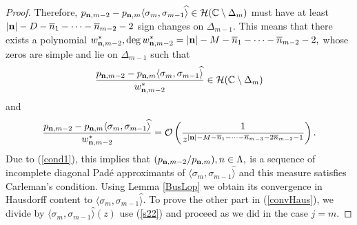 \documentclass[10pt,a4paper]{article}
\theoremstyle{definition}
\theoremstyle{remark}
\numberwithin{equation}{section}
\begin{document}
\begin{proof}
Therefore, $ p_{{\bf n},m-2}- p_{{\bf n},m} \langle \sigma_{m}, \sigma_{m-1} \widehat{\rangle} \in \mathcal{H}(\mathbb{C} \setminus \Delta_m)$ must have at least $|{\bf n}| -D- \overline{n}_1 - \cdots-\overline{n}_{m-2} -2$ sign changes on $\Delta_{m-1}$. This means that there exists a polynomial $w_{{\bf n},m-2}^*, \deg w_{{\bf n},m-2}^* = |{\bf n}| -M- \overline{n}_1 - \cdots-\overline{n}_{m-2} -2,$ whose zeros are simple and lie on $\Delta_{m-1}$ such that
\[ \frac{p_{{\bf n},m-2}- p_{{\bf n},m} \langle \sigma_{m}, \sigma_{m-1} \widehat{\rangle}}{w_{{\bf n},m-2}^*} \in \mathcal{H}(\mathbb{C} \setminus \Delta_m)
\]
and
\[ \frac{p_{{\bf n},m-2}- p_{{\bf n},m} \langle \sigma_{m}, \sigma_{m-1} \widehat{\rangle}}{w_{{\bf n},m-2}^*}  = \mathcal{O}\left(\frac{1}{z^{{|{\bf n}| -M- \overline{n}_1 - \cdots-\overline{n}_{m-3}-2\overline{n}_{m-2}-1}}}\right).
\]
Due to (\ref{cond1}), this implies that $(p_{{\bf n},m-2}/p_{{\bf n},m}), n \in \Lambda,$ is a sequence of incomplete diagonal Pad\'e approximants of $\langle \sigma_{m}, \sigma_{m-1} \widehat{\rangle}$ and this measure satisfies Carleman's condition. Using  Lemma \ref{BusLop} we obtain its convergence in Hausdorff content to $\langle \sigma_{m}, \sigma_{m-1} \widehat{\rangle}$. To prove the other part in (\ref{convHaus}), we divide by $\langle \sigma_m,\sigma_{m-1}\widehat{\rangle}(z)$ use (\ref{s22}) and proceed as we did in the case $j=m$.


\end{proof}
\end{document}
